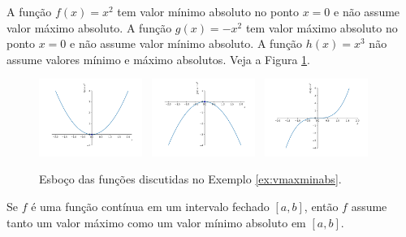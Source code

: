 \begin{ex}\label{ex:vmaxminabs}
  A função $f(x) = x^2$ tem valor mínimo absoluto no ponto $x=0$ e não assume valor máximo absoluto. A função $g(x) = -x^2$ tem valor máximo absoluto no ponto $x=0$ e não assume valor mínimo absoluto. A função $h(x)=x^3$ não assume valores mínimo e máximo absolutos. Veja a Figura \ref{fig:ex_vmaxminabs}.

  \begin{figure}[H]
    \centering
    \includegraphics[width=0.3\textwidth]{./cap_apderiv/dados/fig_ex_vmaxminabs/fig_f}~
    \includegraphics[width=0.3\textwidth]{./cap_apderiv/dados/fig_ex_vmaxminabs/fig_g}~
    \includegraphics[width=0.3\textwidth]{./cap_apderiv/dados/fig_ex_vmaxminabs/fig_h}
    \caption{Esboço das funções discutidas no Exemplo \ref{ex:vmaxminabs}.}
    \label{fig:ex_vmaxminabs}
  \end{figure}
\end{ex}

\begin{teo}
  Se $f$ é uma função contínua em um intervalo fechado $[a, b]$, então $f$ assume tanto um valor máximo como um valor mínimo absoluto em $[a, b]$.
\end{teo}

